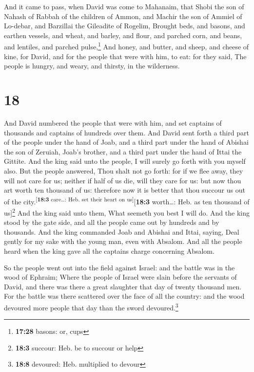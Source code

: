  And it came to pass, when David was come to Mahanaim,
that Shobi the son of Nahash of Rabbah of the children of Ammon, and
Machir the son of Ammiel of Lo-debar, and Barzillai the Gileadite of
Rogelim,  Brought beds, and basons, and earthen vessels,
and wheat, and barley, and flour, and parched corn, and beans, and
lentiles, and parched pulse,\footnote{\textbf{17:28} basons: or, cups}
 And honey, and butter, and sheep, and cheese of kine,
for David, and for the people that were with him, to eat: for they said,
The people is hungry, and weary, and thirsty, in the wilderness.

\hypertarget{section-17}{%
\section{18}\label{section-17}}

 And David numbered the people that were with him, and set
captains of thousands and captains of hundreds over them. 
And David sent forth a third part of the people under the hand of Joab,
and a third part under the hand of Abishai the son of Zeruiah, Joab's
brother, and a third part under the hand of Ittai the Gittite. And the
king said unto the people, I will surely go forth with you myself also.
 But the people answered, Thou shalt not go forth: for if
we flee away, they will not care for us; neither if half of us die, will
they care for us: but now thou art worth ten thousand of us: therefore
now it is better that thou succour us out of the
city.\textsuperscript{{[}\textbf{18:3} care\ldots: Heb. set their heart
on us{]}}{[}\textbf{18:3} worth\ldots: Heb. as ten thousand of
us{]}\footnote{\textbf{18:3} succour: Heb. be to succour or help}
 And the king said unto them, What seemeth you best I will
do. And the king stood by the gate side, and all the people came out by
hundreds and by thousands.  And the king commanded Joab
and Abishai and Ittai, saying, Deal gently for my sake with the young
man, even with Absalom. And all the people heard when the king gave all
the captains charge concerning Absalom.

 So the people went out into the field against Israel: and
the battle was in the wood of Ephraim;  Where the people
of Israel were slain before the servants of David, and there was there a
great slaughter that day of twenty thousand men.  For the
battle was there scattered over the face of all the country: and the
wood devoured more people that day than the sword devoured.\footnote{\textbf{18:8}
  devoured: Heb. multiplied to devour}

